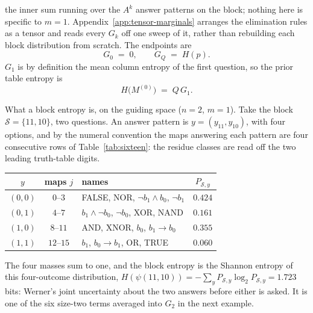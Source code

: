 \documentclass[11pt]{article}
\begin{document}
the inner sum running over the $A^k$ answer patterns on the block;
nothing here is specific to $m = 1$. Appendix~\ref{app:tensor-marginals}
arranges the elimination rules as a tensor and reads every $G_k$ off one
sweep of it, rather than
rebuilding each block distribution from scratch. The endpoints are
\begin{equation}\label{eq:Gk-ends}
  G_0 \;=\; 0,
  \qquad
  G_{Q} \;=\; H(p).
\end{equation}
$G_1$ is by definition the mean column entropy of the first question, so the prior table entropy is
\begin{equation}\label{eq:HM0}
  H\big(M^{(0)}\big) \;=\; Q\, G_1 .
\end{equation}

\begin{example}
What a block entropy is, on the guiding space ($n = 2$, $m = 1$).
Take the block $\mathcal S = \{11, 10\}$, two questions. An
answer pattern is $y = (y_{11}, y_{10})$, with four options, and by
the numeral convention the maps answering each pattern are four
consecutive rows of Table~\ref{tab:sixteen}: the residue classes
are read off the two leading truth-table digits.

\begin{center}
\begin{tabular}{c c l c}
\toprule
$y$ & maps $j$ & names & $P_{\mathcal S,y}$ \\
\midrule
$(0,0)$ & $0$--$3$ & FALSE, NOR, $\lnot b_1 \wedge b_0$,
  $\lnot b_1$ & $0.424$ \\
$(0,1)$ & $4$--$7$ & $b_1 \wedge \lnot b_0$, $\lnot b_0$, XOR,
  NAND & $0.161$ \\
$(1,0)$ & $8$--$11$ & AND, XNOR, $b_0$, $b_1 \to b_0$ & $0.355$ \\
$(1,1)$ & $12$--$15$ & $b_1$, $b_0 \to b_1$, OR, TRUE & $0.060$ \\
\bottomrule
\end{tabular}
\end{center}

The four masses sum to one, and the block entropy is the Shannon
entropy of this four-outcome distribution,
$H(\psi(11,10)) = -\sum_y P_{\mathcal S,y}\log_2
P_{\mathcal S,y} = 1.723$ bits: Werner's joint uncertainty about
the two answers before either is asked. It is one of the six
size-two terms averaged into $G_2$ in the next example.
\end{example}
\end{document}
